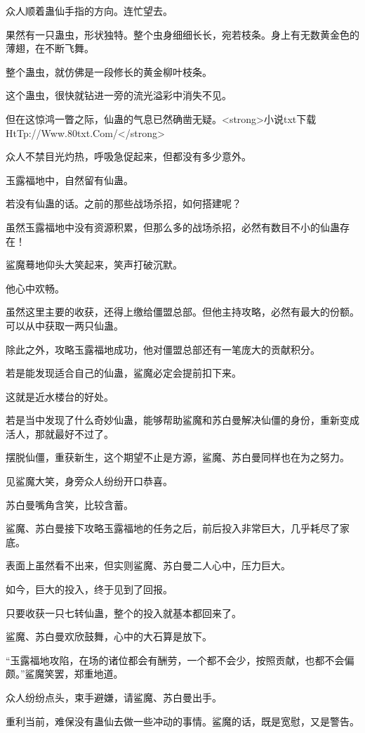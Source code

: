 \begin{this_body}
众人顺着蛊仙手指的方向。连忙望去。

果然有一只蛊虫，形状独特。整个虫身细细长长，宛若枝条。身上有无数黄金色的薄翅，在不断飞舞。

整个蛊虫，就仿佛是一段修长的黄金柳叶枝条。

这个蛊虫，很快就钻进一旁的流光溢彩中消失不见。

但在这惊鸿一瞥之际，仙蛊的气息已然确凿无疑。<strong>小说txt下载HtTp://Www.80txt.Com/</strong>

众人不禁目光灼热，呼吸急促起来，但都没有多少意外。

玉露福地中，自然留有仙蛊。

若没有仙蛊的话。之前的那些战场杀招，如何搭建呢？

虽然玉露福地中没有资源积累，但那么多的战场杀招，必然有数目不小的仙蛊存在！

鲨魔蓦地仰头大笑起来，笑声打破沉默。

他心中欢畅。

虽然这里主要的收获，还得上缴给僵盟总部。但他主持攻略，必然有最大的份额。可以从中获取一两只仙蛊。

除此之外，攻略玉露福地成功，他对僵盟总部还有一笔庞大的贡献积分。

若是能发现适合自己的仙蛊，鲨魔必定会提前扣下来。

这就是近水楼台的好处。

若是当中发现了什么奇妙仙蛊，能够帮助鲨魔和苏白曼解决仙僵的身份，重新变成活人，那就最好不过了。

摆脱仙僵，重获新生，这个期望不止是方源，鲨魔、苏白曼同样也在为之努力。

见鲨魔大笑，身旁众人纷纷开口恭喜。

苏白曼嘴角含笑，比较含蓄。

鲨魔、苏白曼接下攻略玉露福地的任务之后，前后投入非常巨大，几乎耗尽了家底。

表面上虽然看不出来，但实则鲨魔、苏白曼二人心中，压力巨大。

如今，巨大的投入，终于见到了回报。

只要收获一只七转仙蛊，整个的投入就基本都回来了。

鲨魔、苏白曼欢欣鼓舞，心中的大石算是放下。

“玉露福地攻陷，在场的诸位都会有酬劳，一个都不会少，按照贡献，也都不会偏颇。”鲨魔笑罢，郑重地道。

众人纷纷点头，束手避嫌，请鲨魔、苏白曼出手。

重利当前，难保没有蛊仙去做一些冲动的事情。鲨魔的话，既是宽慰，又是警告。


\end{this_body}
